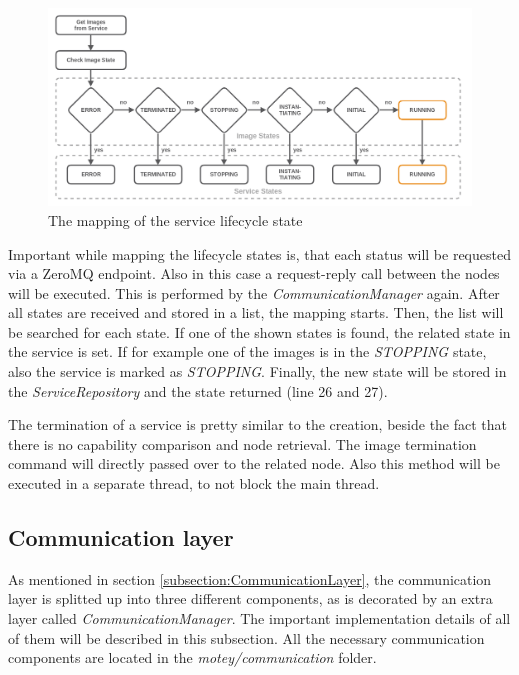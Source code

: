 \begin{figure}[H]
    \centering
    \includegraphics[width=\textwidth]{resources/images/lifecycle_state.png}
    \caption[The mapping of the service lifecycle state]{The mapping of the service lifecycle state}
    \label{fig:lifecycle_mapping}
\end{figure}

Important while mapping the lifecycle states is, that each status will be requested via a ZeroMQ endpoint.
Also in this case a request-reply call between the nodes will be executed.
This is performed by the \textit{CommunicationManager} again.
After all states are received and stored in a list, the mapping starts.
Then, the list will be searched for each state.
If one of the shown states is found, the related state in the service is set.
If for example one of the images is in the \textit{STOPPING} state, also the service is marked as \textit{STOPPING}.
Finally, the new state will be stored in the \textit{ServiceRepository} and the state returned (line 26 and 27).\newline

The termination of a service is pretty similar to the creation, beside the fact that there is no capability comparison and node retrieval.
The image termination command will directly passed over to the related node.
Also this method will be executed in a separate thread, to not block the main thread.

\subsection{Communication layer}
\label{subsection:implementation-communication-layer}
As mentioned in section \ref{subsection:CommunicationLayer}, the communication layer is splitted up into three different components, as is decorated by an extra layer called \textit{CommunicationManager}.
The important implementation details of all of them will be described in this subsection.
All the necessary communication components are located in the \textit{motey/communication} folder.

